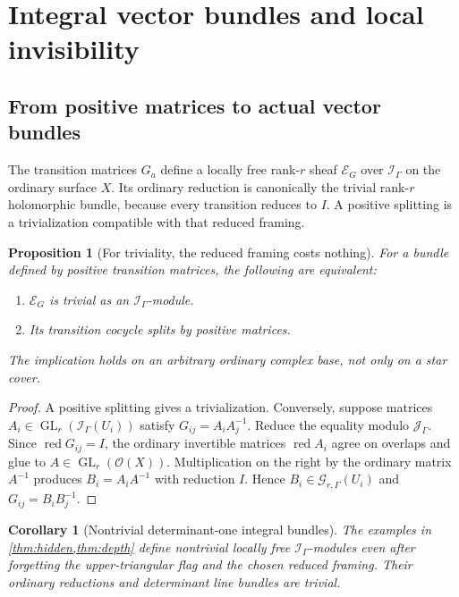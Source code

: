 \documentclass[11pt,letterpaper]{article}
\newtheorem{proposition}[proposition]{Proposition}
\newtheorem{corollary}[corollary]{Corollary}
\theoremstyle{definition}
\theoremstyle{remark}
\newcommand{\OO}{\mathcal O}
\newcommand{\II}{\mathscr I_\Gamma}
\newcommand{\JJ}{\mathscr J_\Gamma}
\newcommand{\GL}{\operatorname{GL}}
\newcommand{\red}{\operatorname{red}}
\numberwithin{equation}{section}
\begin{document}
\section{Integral vector bundles and local invisibility}\label{sec:bundles}

\subsection{From positive matrices to actual vector bundles}

The transition matrices $G_a$ define a locally free rank-$r$ sheaf $\mathcal E_G$ over $\II$ on the ordinary surface $X$. Its ordinary reduction is canonically the trivial rank-$r$ holomorphic bundle, because every transition reduces to $I$. A positive splitting is a trivialization compatible with that reduced framing.

\begin{proposition}[For triviality, the reduced framing costs nothing]\label{prop:integraltrivial}
For a bundle defined by positive transition matrices, the following are equivalent:
\begin{enumerate}[label=\textup{(\roman*)}]
\item $\mathcal E_G$ is trivial as an $\II$-module.
\item Its transition cocycle splits by positive matrices.
\end{enumerate}
The implication holds on an arbitrary ordinary complex base, not only on a star cover.
\end{proposition}

\begin{proof}
A positive splitting gives a trivialization. Conversely, suppose matrices $A_i\in\GL_r(\II(U_i))$ satisfy $G_{ij}=A_iA_j^{-1}$. Reduce the equality modulo $\JJ$. Since $\red G_{ij}=I$, the ordinary invertible matrices $\red A_i$ agree on overlaps and glue to $A\in\GL_r(\OO(X))$. Multiplication on the right by the ordinary matrix $A^{-1}$ produces $B_i=A_iA^{-1}$ with reduction $I$. Hence $B_i\in\mathscr G_{r,\Gamma}(U_i)$ and $G_{ij}=B_iB_j^{-1}$.
\end{proof}

\begin{corollary}[Nontrivial determinant-one integral bundles]\label{cor:nontrivialbundles}
The examples in \cref{thm:hidden,thm:depth} define nontrivial locally free $\II$-modules even after forgetting the upper-triangular flag and the chosen reduced framing. Their ordinary reductions and determinant line bundles are trivial.
\end{corollary}
\end{document}
